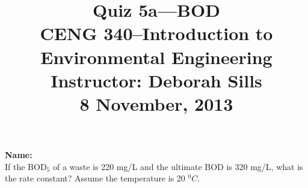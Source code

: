 \documentclass[12pt,letterpaper]{article}
\begin{document}
\setlength{\parindent}{0cm} 


\frenchspacing


\title {\Large{\textbf{Quiz 5a---BOD}}\\ \large{CENG 340--Introduction to Environmental Engineering\\
Instructor: Deborah Sills\\ \textbf{8 November, 2013}}}
\author {}
\date {}
\maketitle

\vspace{-0.4 in}
\textbf{\large{Name:}}\\



If the BOD$_5$ of a waste is 220 mg/L and the ultimate BOD is 320 mg/L, what is the rate constant?  Assume the temperature is 20 $^0C$.
\end{document}
